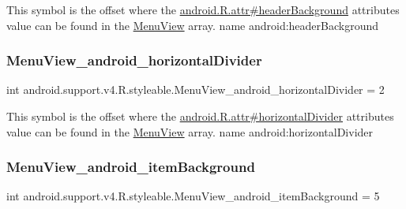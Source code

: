 This symbol is the offset where the \hyperlink{}{android.\+R.\+attr\#header\+Background} attribute\textquotesingle{}s value can be found in the \hyperlink{classandroid_1_1support_1_1v4_1_1R_1_1styleable_a6f981f3b295d914b69b142c57cdfcabf}{Menu\+View} array.  name android\+:header\+Background \mbox{\label{classandroid_1_1support_1_1v4_1_1R_1_1styleable_a626e514babb4d9c7bbca39cdd99c10bf}} 
\subsubsection{\texorpdfstring{Menu\+View\+\_\+android\+\_\+horizontal\+Divider}{MenuView\_android\_horizontalDivider}}
{\footnotesize\ttfamily int android.\+support.\+v4.\+R.\+styleable.\+Menu\+View\+\_\+android\+\_\+horizontal\+Divider = 2\hspace{0.3cm}{\ttfamily [static]}}

This symbol is the offset where the \hyperlink{}{android.\+R.\+attr\#horizontal\+Divider} attribute\textquotesingle{}s value can be found in the \hyperlink{classandroid_1_1support_1_1v4_1_1R_1_1styleable_a6f981f3b295d914b69b142c57cdfcabf}{Menu\+View} array.  name android\+:horizontal\+Divider \mbox{\label{classandroid_1_1support_1_1v4_1_1R_1_1styleable_adda46f208eef1247d481e4c8ecc3c039}} 
\subsubsection{\texorpdfstring{Menu\+View\+\_\+android\+\_\+item\+Background}{MenuView\_android\_itemBackground}}
{\footnotesize\ttfamily int android.\+support.\+v4.\+R.\+styleable.\+Menu\+View\+\_\+android\+\_\+item\+Background = 5\hspace{0.3cm}{\ttfamily [static]}}

